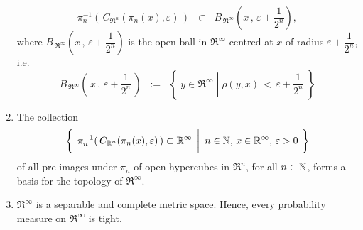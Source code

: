 \begin{theorem}
\begin{enumerate}
		\begin{equation*}
		\pi_{n}^{-1}\!\left(\,C_{\Re^{n}}(\pi_{n}(x),\varepsilon)\,\right)
		\;\;\subset\;\;
		B_{\mbox{}\,\Re^{\infty}}\!\left(x\,,\,\varepsilon + \frac{1}{2^{n}}\right),
		\end{equation*}
		where $B_{\mbox{}\,\Re^{\infty}}\!\left(x\,,\,\varepsilon + \dfrac{1}{2^{n}}\right)$
		is the open ball in $\Re^{\infty}$ centred at $x$ of radius $\varepsilon + \dfrac{1}{2^{n}}$, i.e.
		\begin{equation*}
		B_{\mbox{}\,\Re^{\infty}}\!\left(\,x\,,\,\varepsilon + \frac{1}{2^{n}}\,\right)
		\;\; := \;\;
		\left\{\;
		y \in \Re^{\infty}
		\;\left\vert\;
		\rho(y,x) \,<\, \varepsilon + \frac{1}{2^{n}}
		\right.
		\;\right\}
		\end{equation*}
\item	The collection
		\begin{equation*}
		\left\{\;\,
		\pi_{n}^{-1}\!\left(\,C_{\Re^{n}}(\pi_{n}(x),\varepsilon)\,\right) \subset \Re^{\infty}
		\;\left\vert
		{\color{white}\overset{1}{1}}
		n \in \N,\,x \in \Re^{\infty},\,\varepsilon > 0
		\right.
		\;\right\}
		\end{equation*}
		of all pre-images under $\pi_{n}$ of open hypercubes in $\Re^{n}$, for all $n \in \mathbb{N}$,
		forms a basis for the topology of $\Re^{\infty}$.
\item	$\Re^{\infty}$ is a separable and complete metric space.
		Hence, every probability measure on $\Re^{\infty}$ is tight.
\end{enumerate}
\end{theorem}

